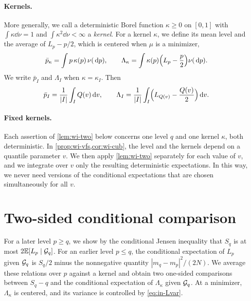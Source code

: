 \paragraph{Kernels.}
More generally, we call a deterministic Borel function $\kappa\ge0$ on
$[0,1]$ with $\int\kappa\dd\nu=1$ and $\int\kappa^2\dd\nu<\infty$ a
\emph{kernel}. For a kernel $\kappa$, we define its mean level and the
average of $L_p-p/2$, which is centered when $\mu$ is a minimizer,
\[
 \bar p_\kappa=\int p\,\kappa(p)\,\nu(\,\mathrm d p),\qquad
 \Lambda_\kappa=\int\kappa(p)\Bigl(L_p-\frac p2\Bigr)\nu(\,\mathrm d p).
\]
We write $\bar p_I$ and $\Lambda_I$ when $\kappa=\kappa_I$. Then
\[
 \bar p_I=\frac1{|I|}\int_IQ(v)\,\mathrm d v,\qquad
 \Lambda_I=\frac1{|I|}\int_I\Bigl(L_{Q(v)}-\frac{Q(v)}2\Bigr)\,\mathrm d v .
\]

\paragraph{Fixed kernels.}
Each assertion of \cref{lem:wi-two} below concerns one level $q$ and one
kernel $\kappa$, both deterministic. In \cref{prop:wi-vfs,cor:wi-cub},
the level and the kernels depend on a quantile parameter $v$. We then
apply \cref{lem:wi-two} separately for each value of $v$, and we
integrate over $v$ only the resulting deterministic expectations. In
this way, we never need versions of the conditional expectations that
are chosen simultaneously for all $v$.

\section{Two-sided conditional comparison}\label{sec:wi-comparison}

For a later level $p\ge q$, we show by the conditional Jensen inequality
that $S_q$ is at most $2\mathbb E[L_p\mid\mathcal G_q]$. For an earlier level $p\le q$,
the conditional expectation of $L_p$ given $\mathcal G_q$ is $S_q/2$ minus the
nonnegative quantity $|m_q-m_p|^2/(2N)$. We average these relations over
$p$ against a kernel and obtain two one-sided comparisons between
$S_q-q$ and the conditional expectation of $\Lambda_\kappa$ given
$\mathcal G_q$. At a minimizer, $\Lambda_\kappa$ is centered, and its
variance is controlled by \eqref{eq:in-Lvar}.

